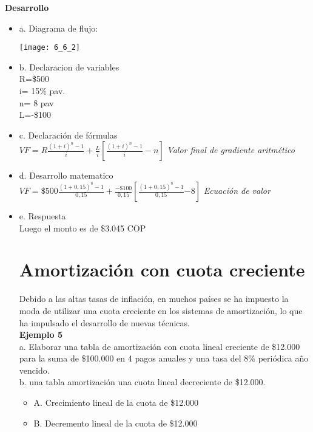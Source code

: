 	\textbf{Desarrollo}
	\begin{itemize}
		\item a. Diagrama de flujo:
		\begin{center}
			\texttt{[image: 6\_6\_2]}
		\end{center}
		\item b. Declaracion de variables\\
		R=\$500\\
		i= 15\% pav.\\
		n= 8 pav\\
		L=-\$100\\
		\item c. Declaración de fórmulas\\
		$VF = R\frac{(1+i)^n-1}{i} + \frac{L}{i}[\frac{(1+i)^n-1}{i}-n]$ \hspace{35 pt} \textit{Valor final de gradiente aritmético}\\
		\item d. Desarrollo matematico\\
		$VF = \$500\frac{(1+0,15)^8-1}{0,15} + \frac{-\$100}{0,15}[\frac{(1+0,15)^8-1}{0,15}{-8}]$ \hspace{30 pt} \textit{Ecuación de valor }\\
		\item e. Respuesta\\
		Luego el monto es de \$3.045 COP\\
		
		\section{Amortización con cuota creciente}
		
		Debido a las altas tasas de inflación, en muchos países se ha impuesto la moda de utilizar una cuota creciente en los sistemas de amortización, lo que ha impulsado el desarrollo de nuevas técnicas.\\
		
		\textbf{Ejemplo 5}\\
		a. Elaborar una tabla de amortización  con cuota lineal creciente de \$12.000 para la suma de \$100.000 en 4 pagos anuales y una tasa del 8\% periódica año vencido.\\ 
        b. una tabla amortización una cuota lineal decreciente de \$12.000.\\
        
		\begin{itemize}
			\item A. Crecimiento lineal de la cuota de \$12.000
			\item B. Decremento lineal de la cuota de \$12.000\\
		\end{itemize}
		

\end{itemize}
